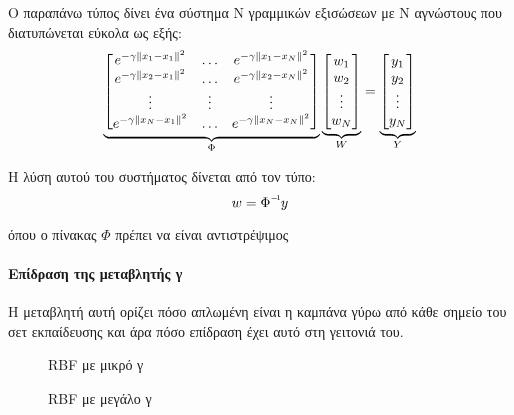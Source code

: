 Ο παραπάνω τύπος δίνει ένα σύστημα Ν γραμμικών εξισώσεων με Ν αγνώστους που διατυπώνεται εύκολα ως εξής:
\[
\underbrace{
	\begin{bmatrix}
	e^{-\gamma \left\lVert x_1 - x_1\right\rVert^2}  & \dots  &  e^{-\gamma \left\lVert x_1 - x_N\right\rVert^2} \\
	e^{-\gamma \left\lVert x_2 - x_1\right\rVert^2}  & \dots  &  e^{-\gamma \left\lVert x_2 - x_N\right\rVert^2} \\
	\vdots  & \vdots & \vdots \\
	e^{-\gamma \left\lVert x_N - x_1\right\rVert^2}  & \dots  &  e^{-\gamma \left\lVert x_N - x_N\right\rVert^2} \\
	\end{bmatrix}}_{  \Phi}
\underbrace{
	\begin{bmatrix}
	w_{1}       \\
	w_{2}        \\
	\vdots        \\
	w_{N}
	\end{bmatrix}}_{W}
=
\underbrace{
	\begin{bmatrix}
	y_{1}       \\
	y_{2}        \\
	\vdots        \\
	y_{N}
	\end{bmatrix}}_{Y}
\]

Η λύση αυτού του συστήματος δίνεται από τον τύπο:
\begin{equation}
w=\inv{\Phi} y
\end{equation}

όπου ο πίνακας $\Phi$ πρέπει να είναι αντιστρέψιμος

\paragraph{Επίδραση της μεταβλητής γ} Η μεταβλητή αυτή ορίζει πόσο απλωμένη είναι η καμπάνα γύρω από κάθε σημείο του σετ εκπαίδευσης και άρα πόσο επίδραση έχει αυτό στη γειτονιά του.
\begin{figure}[H]
	\centering
	\begin{minipage}{.5\textwidth}
		\centering
		\caption[RBF με μικρό γ]{RBF με μικρό γ}		
	\end{minipage}%
	\begin{minipage}{0.5\textwidth}
		\centering
		\caption[RBF με μεγάλο γ]{RBF με μεγάλο γ}		
	\end{minipage}
\end{figure}

